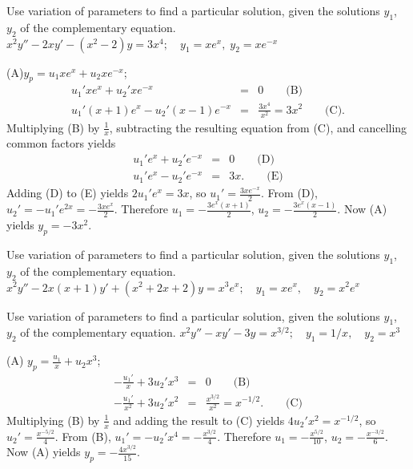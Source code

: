 \documentclass{ximera}
\begin{document}
\begin{problem}\label{exer:5.7.22}
Use variation
of parameters to find a particular solution, given the solutions
$y_1$, $y_2$ of the complementary equation. $x^2y''-2xy'-(x^2-2)y=3x^4;\quad  y_1=xe^x,\;  y_2=xe^{-x}$

\begin{solution}
    (A)$y_p=u_1xe^x+u_2xe^{-x}$;
\begin{eqnarray*}
u_1'xe^x+u_2'xe^{-x}&=&0\qquad\text{(B)}\\ %
u_1'(x+1)e^x-u_2'(x-1)e^{-x}&=&\frac{3x^4}{ x^2}=3x^2\qquad\text{(C)}.
\end{eqnarray*}
Multiplying (B) by $\frac{1}{ x}$, subtracting the
resulting equation from (C), and cancelling common
factors yields
\begin{eqnarray*}
u_1'e^x+u_2'e^{-x}&=&0\qquad\text{(D)}\\ %
u_1'e^x-u_2'e^{-x}&=&3x.\qquad\text{(E)} %
\end{eqnarray*}
Adding (D) to (E) yields
$2u_1'e^x=3x$, so $u_1'=\frac{3xe^{-x}}{2}$. From
(D), $u_2'=-u_1'e^{2x}=-\frac{3xe^x}{2}$.
Therefore $u_1=-\frac{3e^x(x+1)}{2}$, $u_2=-\frac{3e^x(x-1)}{2}$.
Now (A) yields $y_p=-3x^2$.
\end{solution}
\end{problem}

\begin{problem}\label{exer:5.7.23}
Use variation
of parameters to find a particular solution, given the solutions
$y_1$, $y_2$ of the complementary equation. $x^2y''-2x(x+1)y' +(x^2+2x+2)y=x^3e^x;   \quad y_1=xe^x, \quad y_2=x^2e^x$
\end{problem}

\begin{problem}\label{exer:5.7.24}
Use variation
of parameters to find a particular solution, given the solutions
$y_1$, $y_2$ of the complementary equation. $x^2y''-xy'-3y=x^{3/2};  \quad y_1=1/x, \quad y_2=x^3$

\begin{solution}
(A) $y_p=\frac{u_1}{x}+u_2x^3$;\;
\begin{eqnarray*}
-\frac{u_1'}{x}+3u_2'x^3&=&0\qquad\text{(B)}\\ %
-\frac{u_1'}{x^2}+3u_2'x^2&=&\frac{x^{3/2}}{x^2}=x^{-1/2}. \qquad\text{(C)}%
\end{eqnarray*}
Multiplying (B) by $\frac{1}{x}$ and
adding the result to (C) yields
$4u_2'x^2=x^{-1/2}$, so $u_2'=\frac{x^{-5/2}}{4}$. From
(B), $u_1'=-u_2'x^4=-\frac{x^{3/2}}{4}$.
Therefore $u_1=-\frac{x^{5/2}}{10}$, $u_2=-\frac{x^{-3/2}}{6}$.
Now (A) yields $y_p=-\frac{4x^{3/2}}{15}$.
\end{solution}
\end{problem}
\end{document}
